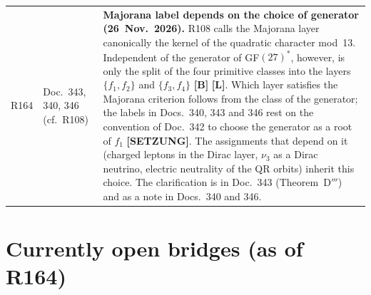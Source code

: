 \begin{longtable}{@{}p{0.9cm}p{3.1cm}p{10.2cm}@{}}
R164 & Doc.~343, 340, 346 (cf.\ R108) & \textbf{Majorana label depends on the choice of generator (26~Nov.~2026).} R108 calls the Majorana layer canonically the kernel of the quadratic character mod~13. Independent of the generator of GF$(27)^*$, however, is only the split of the four primitive classes into the layers $\{f_1,f_2\}$ and $\{f_3,f_4\}$ \textbf{[B]} \textbf{[L]}. Which layer satisfies the Majorana criterion follows from the class of the generator; the labels in Docs.~340, 343 and 346 rest on the convention of Doc.~342 to choose the generator as a root of $f_1$ \textbf{[SETZUNG]}. The assignments that depend on it (charged leptons in the Dirac layer, $\nu_3$ as a Dirac neutrino, electric neutrality of the QR orbits) inherit this choice. The clarification is in Doc.~343 (Theorem~D$'''$) and as a note in Docs.~340 and 346. \\
\end{longtable}
\endgroup

\section{Currently open bridges (as of R164)}

